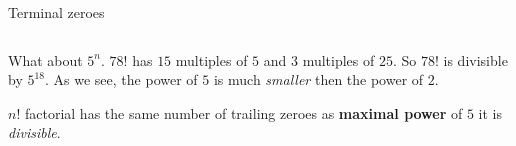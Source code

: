 \documentclass[9pt,aspectratio=169]{beamer}
\begin{document}
\begin{frame}{Terminal zeroes}
\begin{columns}[T]
\begin{column}{0.5\textwidth}
      What about $5^n$. $78!$ has $15$ multiples of $5$ and $3$ multiples of $25$. So $78!$ is divisible by $5^{18}$. As we see, the power of $5$ is much \emph{smaller} then the power of $2$.
      \begin{definition}
        $n!$ factorial has the same number of trailing zeroes as \textbf{maximal power} of $5$ it is \emph{divisible}.
      \end{definition}
    \end{column}
  \end{columns}
\end{frame}

\end{document}
